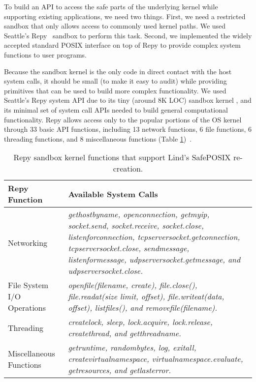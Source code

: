 To build an API to access the safe parts of the underlying kernel while
supporting existing applications, we need two things. First, we need a
restricted sandbox that only allows access to commonly used kernel paths. We
used Seattle's Repy~\cite{Repy-10} sandbox to perform this task. Second, we
implemented the widely accepted standard POSIX interface on top of Repy to
provide complex system functions to user programs.

Because the sandbox kernel is the only code in direct contact with the host
system calls, it should be small (to make it easy to audit) while providing
primitives that can be used to build more complex functionality.
We used Seattle's Repy system API due to its tiny (around 8K LOC) sandbox
kernel , and its minimal set of system call APIs needed to build general
computational functionality. Repy allows access only to the popular portions of
the OS kernel through 33 basic API functions, including 13 network functions, 6
file functions, 6 threading functions, and 8 miscellaneous functions (Table
\ref{table:RepyKernel})~\cite{Repy-10, RepyKernel}.

\begin{table}
\centering
  \begin{tabular}{ | p{2.5cm} | p{4.5cm} |}
  \hline
  \textbf{Repy Function} & \textbf{Available System Calls}  \\ \hline

Networking & \emph{gethostbyname, openconnection, getmyip, socket.send, socket.receive, socket.close,
listenforconnection, tcpserversocket.getconnection, tcpserversocket.close, sendmessage, listenformessage,
udpserversocket.getmessage, and udpserversocket.close.} \\ \hline

File System I/O Operations & \emph{openfile(filename, create), file.close(), file.readat(size limit, offset), file.writeat(data, offset), 
listfiles(), and removefile(filename).} \\ \hline

Threading & \emph{createlock, sleep, lock.acquire, lock.release, createthread, and getthreadname.} \\ \hline

Miscellaneous Functions & \emph{getruntime, randombytes, log, exitall, createvirtualnamespace,
virtualnamespace.evaluate, getresources, and getlasterror.}  \\ \hline
    \end{tabular}
    \caption{Repy sandbox kernel functions that support Lind's SafePOSIX re-creation.}
    \label{table:RepyKernel}
\end{table}


